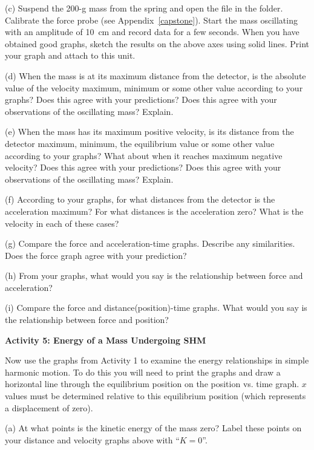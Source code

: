 (c) Suspend the 200-g mass from the spring and open the file  in the \filename{\coursefolder} folder. Calibrate the force probe (see Appendix~\ref{capstone}).
Start the mass oscillating with an amplitude of 10~cm and record data for a few seconds.
When you have obtained good graphs, sketch the results on the above axes using
solid lines. Print your graph and attach to this unit.

(d) When the mass is at its maximum distance from the detector, is the absolute
 value of the velocity
maximum, minimum or some other value according to your graphs? Does this agree
with your predictions? Does this agree with your observations of the oscillating
mass? Explain.
\answerspace{15mm}

\pagebreak[2]
(e) When the mass has its maximum positive velocity, is its distance from the
detector maximum, minimum, the equilibrium value or some other value according
to your graphs? What about when it reaches maximum negative velocity? Does this
agree with your predictions? Does this agree with your observations of the 
oscillating mass? Explain. 
\answerspace{10mm}

(f) According to your graphs, for what distances from the detector is the 
acceleration maximum? For what distances is the acceleration zero? What is the 
velocity in each of these cases?
\answerspace{20mm}

(g) Compare the force and acceleration-time graphs. Describe any similarities.
Does the force graph agree with your prediction?
\answerspace{20mm}

(h) From your graphs, what would you say is the relationship between force and
acceleration? 
\answerspace{20mm}

(i) Compare the force and distance(position)-time graphs. What would you say
is the relationship between force and position? 
\answerspace{20mm}

\textbf{Activity 5: Energy of a Mass Undergoing SHM }

Now use the graphs from Activity 1 to examine the energy relationships
in simple harmonic motion. To do this you will need to print the graphs and draw a horizontal line through the equilibrium position on the position vs. time graph.  $x$ values must be determined relative to this equilibrium position (which represents a displacement of zero).

(a) At what points is the kinetic energy of the mass zero? Label these points
on your distance and velocity graphs above with ``$K=0$''.

